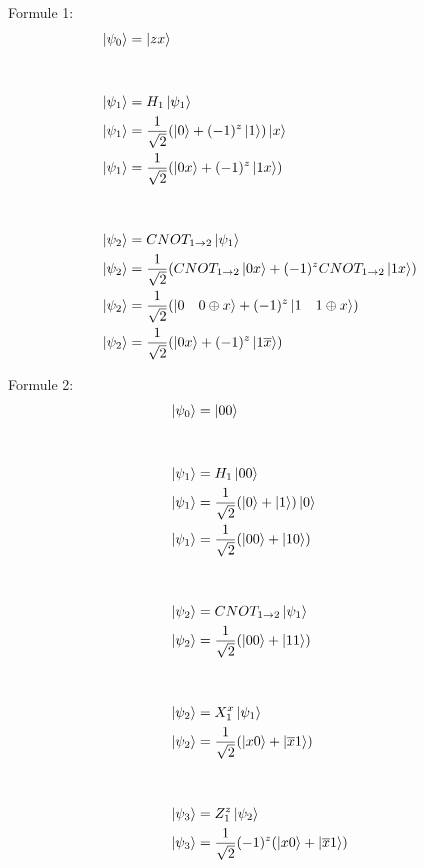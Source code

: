 \documentclass{article}
\begin{document}
Formule 1:
\begin{align*}
    \ket{\psi_0} &= \ket{zx} \\ \\ \\
    \ket{\psi_1} &= H_1\ket{\psi_1} \\
    \ket{\psi_1} &= \frac{1}{\sqrt{2}}(\ket{0} + (-1)^z\ket{1})\ket{x} \\
    \ket{\psi_1} &= \frac{1}{\sqrt{2}}(\ket{0x} + (-1)^z\ket{1x}) \\ \\ \\
    \ket{\psi_2} &= CNOT_{1\rightarrow2}\ket{\psi_1} \\
    \ket{\psi_2} &= \frac{1}{\sqrt{2}}(CNOT_{1\rightarrow2}\ket{0x} + (-1)^zCNOT_{1\rightarrow2}\ket{1x}) \\
    \ket{\psi_2} &= \frac{1}{\sqrt{2}}(\ket{0 \quad 0 \oplus x} + (-1)^z \ket{1 \quad 1 \oplus x}) \\
    \ket{\psi_2} &= \frac{1}{\sqrt{2}}(\ket{0x} + (-1)^z \ket{1\overline{x}}) \\
\end{align*}

Formule 2:
\begin{align*}
    \ket{\psi_0} &= \ket{00} \\ \\ \\
    \ket{\psi_1} &= H_1\ket{00} \\
    \ket{\psi_1} &= \frac{1}{\sqrt{2}}(\ket{0} + \ket{1})\ket{0} \\
    \ket{\psi_1} &= \frac{1}{\sqrt{2}}(\ket{00} + \ket{10}) \\ \\ \\
    \ket{\psi_2} &= CNOT_{1\rightarrow2}\ket{\psi_1} \\
    \ket{\psi_2} &= \frac{1}{\sqrt{2}}(\ket{00} + \ket{11}) \\ \\ \\
    \ket{\psi_2} &= X^x_1\ket{\psi_1} \\
    \ket{\psi_2} &= \frac{1}{\sqrt{2}}(\ket{x0} + \ket{\overline{x}1}) \\ \\ \\
    \ket{\psi_3} &= Z^z_1\ket{\psi_2} \\
    \ket{\psi_3} &= \frac{1}{\sqrt{2}}(-1)^z(\ket{x0} + \ket{\overline{x}1})
\end{align*}
\end{document}
